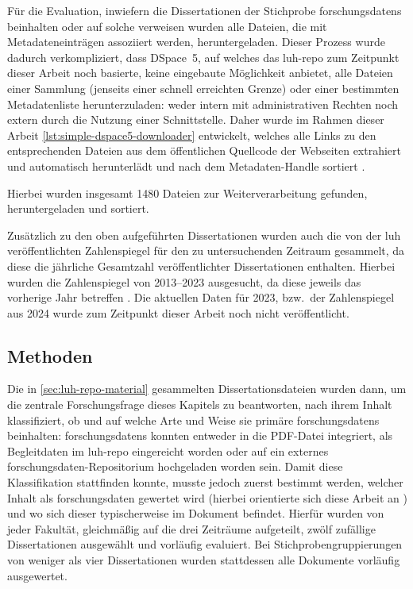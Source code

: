 Für die Evaluation, inwiefern die Dissertationen der Stichprobe \glspl{forschungsdaten} beinhalten oder auf solche verweisen wurden alle Dateien, die mit Metadateneinträgen assoziiert werden, heruntergeladen.
Dieser Prozess wurde dadurch verkompliziert, dass DSpace~5, auf welches das \gls{luh-repo} zum Zeitpunkt dieser Arbeit noch basierte, keine eingebaute Möglichkeit anbietet, alle Dateien einer Sammlung (jenseits einer schnell erreichten Grenze) oder einer bestimmten Metadatenliste herunterzuladen:
weder intern mit administrativen Rechten noch extern durch die Nutzung einer Schnittstelle.
Daher wurde im Rahmen dieser Arbeit \cref{lst:simple-dspace5-downloader} entwickelt, welches alle Links zu den entsprechenden Dateien aus dem öffentlichen Quellcode der Webseiten extrahiert und automatisch herunterlädt und nach dem Metadaten-Handle sortiert \autocite{Krassnig2024-dspace}.

Hierbei wurden insgesamt \num{1480} Dateien zur Weiterverarbeitung gefunden, heruntergeladen und sortiert.

Zusätzlich zu den oben aufgeführten Dissertationen wurden auch die von der \gls{luh} veröffentlichten Zahlenspiegel für den zu untersuchenden Zeitraum gesammelt, da diese die jährliche Gesamtzahl veröffentlichter Dissertationen enthalten.
Hierbei wurden die Zahlenspiegel von 2013--2023 ausgesucht, da diese jeweils das vorherige Jahr betreffen \autocite{Zahlenspiegel2013,Zahlenspiegel2014,Zahlenspiegel2015,Zahlenspiegel2016,Zahlenspiegel2017,Zahlenspiegel2018,Zahlenspiegel2019,Zahlenspiegel2020,Zahlenspiegel2021,Zahlenspiegel2022,Zahlenspiegel2023}.
Die aktuellen Daten für 2023, bzw.~der Zahlenspiegel aus 2024 wurde zum Zeitpunkt dieser Arbeit noch nicht veröffentlicht.

\subsection{Methoden}\label{sec:luh-repo-methods}
Die in \cref{sec:luh-repo-material} gesammelten Dissertationsdateien wurden dann, um die zentrale Forschungsfrage dieses Kapitels zu beantworten, nach ihrem Inhalt klassifiziert, ob und auf welche Arte und Weise sie primäre \glspl{forschungsdaten} beinhalten:
\glspl{forschungsdaten} konnten entweder in die PDF-Datei integriert, als Begleitdaten im \gls{luh-repo} eingereicht worden oder auf ein externes \gls{forschungsdaten}-Repositorium hochgeladen worden sein.
Damit diese Klassifikation stattfinden konnte, musste jedoch zuerst bestimmt werden, welcher Inhalt als \gls{forschungsdaten} gewertet wird (hierbei orientierte sich diese Arbeit an \autocite{dfg-richtlinie,Simukovic2014InterviewFD}) und wo sich dieser typischerweise im Dokument befindet.
Hierfür wurden von jeder Fakultät, gleichmäßig auf die drei Zeiträume aufgeteilt, zwölf zufällige Dissertationen ausgewählt und vorläufig evaluiert.
Bei Stichprobengruppierungen von weniger als vier Dissertationen wurden stattdessen alle Dokumente vorläufig ausgewertet.

